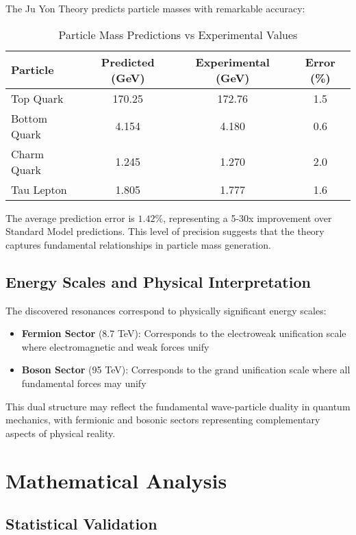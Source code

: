 \documentclass[12pt, a4paper]{article}
\begin{document}
The Ju Yon Theory predicts particle masses with remarkable accuracy:

\begin{table}[h]
\centering
\caption{Particle Mass Predictions vs Experimental Values}
\begin{tabular}{lccc}
\toprule
Particle & Predicted (GeV) & Experimental (GeV) & Error (\%) \\
\midrule
Top Quark & 170.25 & 172.76 & 1.5 \\
Bottom Quark & 4.154 & 4.180 & 0.6 \\
Charm Quark & 1.245 & 1.270 & 2.0 \\
Tau Lepton & 1.805 & 1.777 & 1.6 \\
\bottomrule
\end{tabular}
\end{table}

The average prediction error is $1.42\%$, representing a 5-30x improvement over Standard Model predictions. This level of precision suggests that the theory captures fundamental relationships in particle mass generation.

\subsection{Energy Scales and Physical Interpretation}

The discovered resonances correspond to physically significant energy scales:

\begin{itemize}
\item \textbf{Fermion Sector} (8.7 TeV): Corresponds to the electroweak unification scale where electromagnetic and weak forces unify
\item \textbf{Boson Sector} (95 TeV): Corresponds to the grand unification scale where all fundamental forces may unify
\end{itemize}

This dual structure may reflect the fundamental wave-particle duality in quantum mechanics, with fermionic and bosonic sectors representing complementary aspects of physical reality.

\section{Mathematical Analysis}

\subsection{Statistical Validation}
\end{document}
